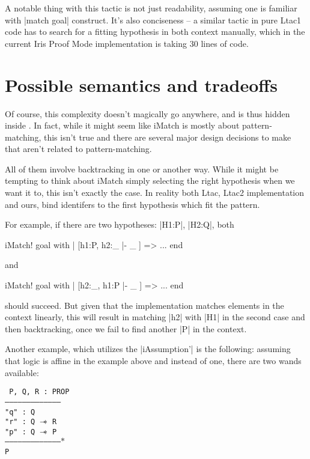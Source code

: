 A notable thing with this tactic is not just readability, assuming one is familiar with \coqe|match goal| construct.
It's also conciseness -- a similar tactic in pure Ltac1 code has to search for a fitting hypothesis in both context manually, which in the current Iris Proof Mode implementation is taking 30 lines of code.

\section{Possible semantics and tradeoffs}

Of course, this complexity doesn't magically go anywhere, and is thus hidden inside \iMatch.
In fact, while it might seem like iMatch is mostly about pattern-matching, this isn't true and there are several major design decisions to make that aren't related to pattern-matching.

All of them involve backtracking in one or another way.
While it might be tempting to think about iMatch simply selecting the right hypothesis when we want it to, this isn't exactly the case.
In reality both Ltac, Ltac2 implementation and ours, bind identifers to the first hypothesis which fit the pattern.

For example, if there are two hypotheses: \coqe|H1:P|, \coqe|H2:Q|,
both
\begin{coq}
  iMatch! goal with
  | [h1:P, h2:_ |- _ ] => ...
  end
\end{coq}
and
\begin{coq}
  iMatch! goal with
  | [h2:_, h1:P |- _ ] => ...
  end
\end{coq}
should succeed.
But given that the implementation matches elements in the context linearly, this will result in matching \coqe|h2| with \coqe|H1| in the second case and then backtracking, once we fail to find another \coqe|P| in the context.

Another example, which utilizes the \coqe|iAssumption'| is the following: assuming that logic is affine in the example above and instead of one, there are two wands available:

\texttt{
P, Q, R : PROP\\
---------------------------------------\\
"q" : Q\\
"r" : Q $\mathrel{-\mkern-6mu*}$ R\\
"p" : Q $\mathrel{-\mkern-6mu*}$ P\\
--------------------------------------$\ast$\\
P
}

